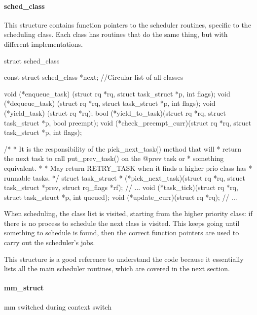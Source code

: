 \paragraph{sched\_class}
This structure contains function pointers to the scheduler routines, specific to the scheduling class. Each class has routines that do the same thing, but with different implementations.

\begin{code}
struct sched_class {
	const struct sched_class *next; //Circular list of all classes

	void (*enqueue_task) (struct rq *rq, struct task_struct *p, int flags);
	void (*dequeue_task) (struct rq *rq, struct task_struct *p, int flags);
	void (*yield_task)   (struct rq *rq);
	bool (*yield_to_task)(struct rq *rq, struct task_struct *p, bool preempt);
	void (*check_preempt_curr)(struct rq *rq, struct task_struct *p, int flags);

	/*
	 * It is the responsibility of the pick_next_task() method that will
	 * return the next task to call put_prev_task() on the @prev task or
	 * something equivalent.
	 *
	 * May return RETRY_TASK when it finds a higher prio class has 
	 * runnable tasks.
	 */
	struct task_struct * (*pick_next_task)(struct rq *rq,
					       struct task_struct *prev,
					       struct rq_flags *rf);
    // ...
    void (*task_tick)(struct rq *rq, struct task_struct *p, int queued);
    void (*update_curr)(struct rq *rq);
    // ...
}
\end{code}
When scheduling, the class list is visited, starting from the higher priority class: if there is no process to schedule the next class is visited. This keeps going until something to schedule is found, then the correct function pointers are used to carry out the scheduler's jobs. 

This structure is a good reference to understand the code because it essentially lists all the main scheduler routines, which are covered in the next section.

\paragraph{mm\_struct} %
 mm switched during context switch

